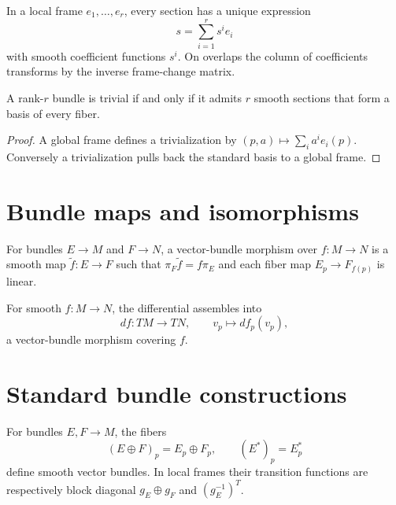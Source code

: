 \begin{proposition}\label{prop:vii07-section-local}
In a local frame \(e_1,\ldots,e_r\), every section has a unique expression
\[
s=\sum_{i=1}^r s^i e_i
\]
with smooth coefficient functions \(s^i\). On overlaps the column of coefficients transforms by the inverse frame-change matrix.
\end{proposition}

\begin{proposition}\label{prop:vii07-global-frame}
A rank-\(r\) bundle is trivial if and only if it admits \(r\) smooth sections that form a basis of every fiber.
\end{proposition}
\begin{proof}
A global frame defines a trivialization by \((p,a)\mapsto\sum_i a^i e_i(p)\). Conversely a trivialization pulls back the standard basis to a global frame.
\end{proof}

\section{Bundle maps and isomorphisms}
\begin{definition}\label{def:vii07-bundle-map}
For bundles \(E\to M\) and \(F\to N\), a vector-bundle morphism over \(f:M\to N\) is a smooth map \(\widetilde f:E\to F\) such that \(\pi_F\widetilde f=f\pi_E\) and each fiber map \(E_p\to F_{f(p)}\) is linear.
\end{definition}

\begin{example}\label{ex:vii07-differential-bundle-map}
For smooth \(f:M\to N\), the differential assembles into
\[
df:TM\to TN,\qquad v_p\mapsto d f_p(v_p),
\]
a vector-bundle morphism covering \(f\).
\end{example}

\section{Standard bundle constructions}
\begin{proposition}\label{prop:vii07-direct-dual}
For bundles \(E,F\to M\), the fibers
\[
(E\oplus F)_p=E_p\oplus F_p,\qquad (E^*)_p=E_p^*
\]
define smooth vector bundles. In local frames their transition functions are respectively block diagonal \(g_E\oplus g_F\) and \((g_E^{-1})^{\!T}\).
\end{proposition}

